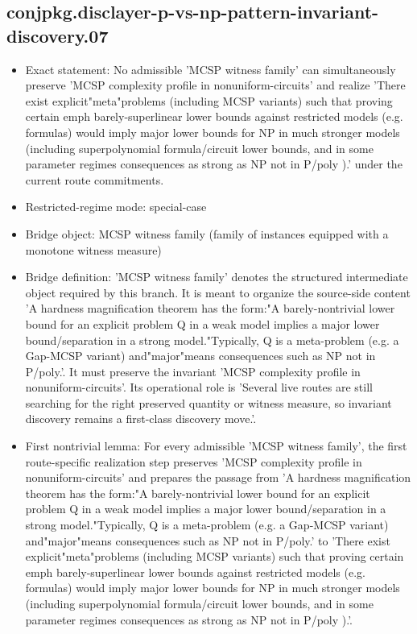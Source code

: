 \documentclass[11pt]{article}
\begin{document}
\subsection*{conjpkg.disclayer-p-vs-np-pattern-invariant-discovery.07}
\begin{itemize}
\item Exact statement: No admissible 'MCSP witness family' can simultaneously preserve 'MCSP complexity profile in nonuniform-circuits' and realize 'There exist explicit"meta"problems (including MCSP variants) such that proving certain emph barely-superlinear lower bounds against restricted models (e.g. formulas) would imply major lower bounds for NP in much stronger models (including superpolynomial formula/circuit lower bounds, and in some parameter regimes consequences as strong as NP not in P/poly ).' under the current route commitments.
\item Restricted-regime mode: special-case
\item Bridge object: MCSP witness family (family of instances equipped with a monotone witness measure)
\item Bridge definition: 'MCSP witness family' denotes the structured intermediate object required by this branch. It is meant to organize the source-side content 'A hardness magnification theorem has the form:"A barely-nontrivial lower bound for an explicit problem Q in a weak model implies a major lower bound/separation in a strong model."Typically, Q is a meta-problem (e.g. a Gap-MCSP variant) and"major"means consequences such as NP not in P/poly.'. It must preserve the invariant 'MCSP complexity profile in nonuniform-circuits'. Its operational role is 'Several live routes are still searching for the right preserved quantity or witness measure, so invariant discovery remains a first-class discovery move.'.
\item First nontrivial lemma: For every admissible 'MCSP witness family', the first route-specific realization step preserves 'MCSP complexity profile in nonuniform-circuits' and prepares the passage from 'A hardness magnification theorem has the form:"A barely-nontrivial lower bound for an explicit problem Q in a weak model implies a major lower bound/separation in a strong model."Typically, Q is a meta-problem (e.g. a Gap-MCSP variant) and"major"means consequences such as NP not in P/poly.' to 'There exist explicit"meta"problems (including MCSP variants) such that proving certain emph barely-superlinear lower bounds against restricted models (e.g. formulas) would imply major lower bounds for NP in much stronger models (including superpolynomial formula/circuit lower bounds, and in some parameter regimes consequences as strong as NP not in P/poly ).'.

\end{itemize}
\end{document}

